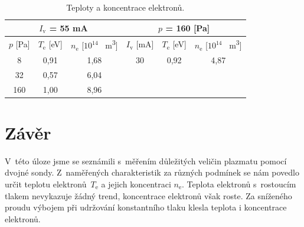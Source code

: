\documentclass[a4paper,12pt]{article}
\begin{document}
\newpage
\begin{center}
	\begin{table}[h!]
		\centering
		\caption{Teploty a koncentrace elektronů.}
		\label{tab1}
		\begin{tabular}{|c|c|c|c|c|c|} \hline
			\multicolumn{3}{|c|}{$I_\text{v}$ = 55 \si{\milli\ampere}}& \multicolumn{3}{c|}{$p$ = 160 [\si{\pascal}] }  \\ \hline
			$p$ [\si{\pascal}] & $T_\text{e}$ [\si{\electronvolt}]  & $n_\text{e}$ [$10^{14}$ \si{\per\meter\cubed}]& $I_\text{v}$ [\si{\milli\ampere}] & $T_\text{e}$ [\si{\electronvolt}] & $n_\text{e}$  [$10^{14}$ \si{\per\meter\cubed}]\\ \hline
			8 & 0,91 & 1,68 & 30 & 0,92 & 4,87\\ \hline
			32 & 0,57 & 6,04 &  &  &  \\ \hline
			160 & 1,00 & 8,96 &  &  &  \\ \hline
			
		\end{tabular}
	\end{table}
\end{center}

\newpage
\section{Závěr}
V~této úloze jsme se seznámili s~měřením důležitých veličin plazmatu pomocí dvojné sondy.
Z~naměřených charakteristik za různých podmínek se nám povedlo určit teplotu
elektronů~$T_\text{e}$ a jejich koncentraci $n_\text{e}$. Teplota elektronů s~rostoucím tlakem
nevykazuje žádný trend, koncentrace elektronů však roste. Za sníženého proudu výbojem
při udržování konstantního tlaku klesla teplota i koncentrace elektronů.
\end{document}
